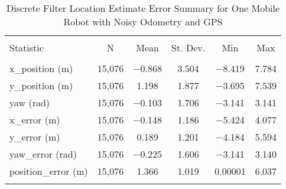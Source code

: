 
\begin{table}[htbp] \centering 
  \caption{Discrete Filter Location Estimate Error Summary for One Mobile Robot with Noisy Odometry and GPS} 
  \label{tab:one_mobile_discrete_summary} 
\begin{tabular}{@{\extracolsep{5pt}}lccccc} 
\\[-1.8ex]\hline 
\hline \\[-1.8ex] 
Statistic & \multicolumn{1}{c}{N} & \multicolumn{1}{c}{Mean} & \multicolumn{1}{c}{St. Dev.} & \multicolumn{1}{c}{Min} & \multicolumn{1}{c}{Max} \\ 
\hline \\[-1.8ex] 
x\_position (m) & 15,076 & $-$0.868 & \num{3.504} & $-$8.419 & \num{7.784} \\ 
y\_position (m) & 15,076 & \num{1.198} & \num{1.877} & $-$3.695 & \num{7.539} \\ 
yaw (rad) & 15,076 & $-$0.103 & \num{1.706} & $-$3.141 & \num{3.141} \\ 
x\_error (m) & 15,076 & $-$0.148 & \num{1.186} & $-$5.424 & \num{4.077} \\ 
y\_error (m) & 15,076 & \num{0.189} & \num{1.201} & $-$4.184 & \num{5.594} \\ 
yaw\_error (rad) & 15,076 & $-$0.225 & \num{1.606} & $-$3.141 & \num{3.140} \\ 
position\_error (m) & 15,076 & \num{1.366} & \num{1.019} & \num{0.00001} & \num{6.037} \\ 
\hline \\[-1.8ex] 
\end{tabular} 
\end{table} 
